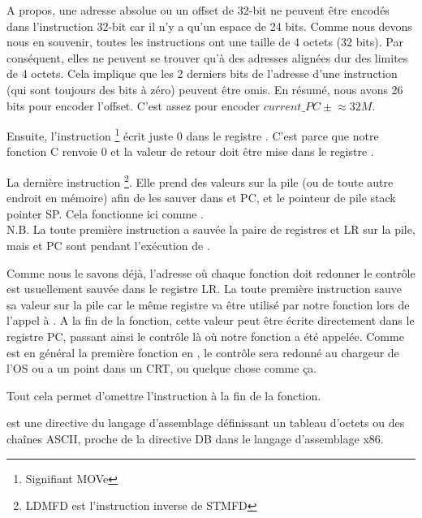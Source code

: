 A propos, une adresse absolue ou un offset de 32-bit ne peuvent être encodés
dans l'instruction 32-bit  car il n'y a qu'un espace de 24 bits.
Comme nous devons nous en souvenir, toutes les instructions ont une taille de
4 octets (32 bits).
Par conséquent, elles ne peuvent se trouver qu'à des adresses alignées dur des
limites de 4 octets.
Cela implique que les 2 derniers bits de l'adresse d'une instruction (qui sont
toujours des bits à zéro) peuvent être omis.
En résumé, nous avons 26 bits pour encoder l'offset. C'est assez pour encoder
$current\_PC \pm{} \approx{}32M$.

Ensuite, l'instruction \footnote{Signifiant MOVe} écrit juste
0 dans le registre .
C'est parce que notre fonction C renvoie 0 et la valeur de retour doit être
mise dans le registre .

La dernière instruction \footnote{\ac{LDMFD} est
l'instruction inverse de \ac{STMFD}}.
Elle prend des valeurs sur la pile (ou de toute autre endroit en mémoire)
afin de les sauver dans  et \ac{PC}, et 
le pointeur de pile \gls{stack pointer} \ac{SP}.
Cela fonctionne ici comme \POP.\\
N.B. La toute première instruction  a sauvée la paire de registres
 et \ac{LR} sur la pile, mais  et \ac{PC} sont 
 pendant l'exécution de .

Comme nous le savons déjà, l'adresse où chaque fonction doit redonner le
contrôle est usuellement sauvée dans le registre \ac{LR}.
La toute première instruction sauve sa valeur sur la pile car le même
registre va être utilisé par notre fonction \main lors de l'appel à \printf.
A la fin de la fonction, cette valeur peut être écrite directement dans le
registre \ac{PC}, passant ainsi le contrôle là où notre fonction a été appelée.
Comme \main est en général la première fonction en \CCpp, le contrôle sera
redonné au chargeur de l'\ac{OS} ou a un point dans un \ac{CRT}, ou quelque
chose comme ça.

Tout cela permet d'omettre l'instruction  à la fin de la fonction.

 est une directive du langage d'assemblage définissant un tableau d'octets
ou des chaînes ASCII, proche de la directive DB dans le langage d'assemblage x86.

